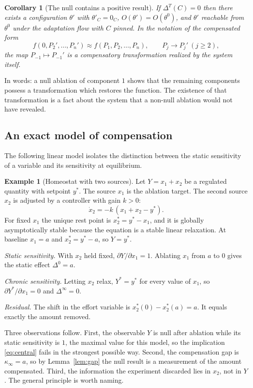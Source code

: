 \documentclass[11pt]{article}
\newtheorem{corollary}[theorem]{Corollary}
\theoremstyle{definition}
\newtheorem{example}[theorem]{Example}
\theoremstyle{remark}
\begin{document}
\begin{corollary}[The null contains a positive result]\label{cor:hidden}
If $\Delta^T(C)=0$ then there exists a configuration $\theta'$ with $\theta'_C=0_C$, $O(\theta')=O(\theta^0)$, and $\theta'$ reachable from $\theta^0$ under the adaptation flow with $C$ pinned. In the notation of the compensated form
\[
f(0,P_2',\dots,P_n')\approx f(P_1,P_2,\dots,P_n),\qquad P_j\longrightarrow P_j'\ (j\ge 2),
\]
the map $P_{-1}\mapsto P_{-1}'$ is a \emph{compensatory transformation} realized by the system itself.
\end{corollary}

In words: a null ablation of component $1$ shows that the remaining components possess a transformation which restores the function. The existence of that transformation is a fact about the system that a non-null ablation would not have revealed.

\subsection{An exact model of compensation}

The following linear model isolates the distinction between the static sensitivity of a variable and its sensitivity at equilibrium.

\begin{example}[Homeostat with two sources]\label{ex:homeostat}
Let $Y=x_1+x_2$ be a regulated quantity with setpoint $y^*$. The source $x_1$ is the ablation target. The second source $x_2$ is adjusted by a controller with gain $k>0$:
\[
\dot x_2=-k\,(x_1+x_2-y^*).
\]
For fixed $x_1$ the unique rest point is $x_2^*=y^*-x_1$, and it is globally asymptotically stable because the equation is a stable linear relaxation. At baseline $x_1=a$ and $x_2^*=y^*-a$, so $Y=y^*$.

\emph{Static sensitivity.} With $x_2$ held fixed, $\partial Y/\partial x_1=1$. Ablating $x_1$ from $a$ to $0$ gives the static effect $\Delta^0=a$.

\emph{Chronic sensitivity.} Letting $x_2$ relax, $Y^*=y^*$ for every value of $x_1$, so $\partial Y^*/\partial x_1=0$ and $\Delta^\infty=0$.

\emph{Residual.} The shift in the effort variable is $x_2^*(0)-x_2^*(a)=a$. It equals exactly the amount removed.
\end{example}

Three observations follow. First, the observable $Y$ is null after ablation while its static sensitivity is $1$, the maximal value for this model, so the implication \eqref{eq:central} fails in the strongest possible way. Second, the compensation gap is $\kappa_\infty=a$, so by Lemma~\ref{lem:gap} the null result is a measurement of the amount compensated. Third, the information the experiment discarded lies in $x_2$, not in $Y$. The general principle is worth naming.
\end{document}
